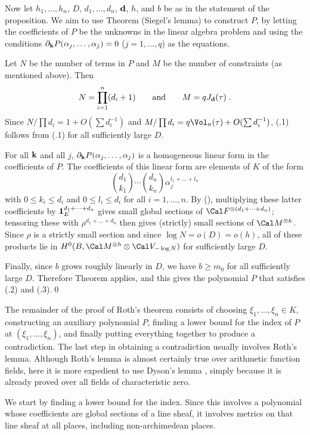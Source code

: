 Now let $h_1,\dots,h_n$, $D$, $d_1,\dots,d_n$, $\bold d$, $h$, and $b$ be as
in the statement of the proposition.  We aim to use Theorem 
(Siegel's lemma) to construct $P$, by letting the coefficients of $P$ be the
unknowns in the linear algebra problem and using the conditions
$\partial_{\bold k}P(\alpha_j,\dots,\alpha_j)=0$ ($j=1,\dots,q$)
as the equations.

Let $N$ be the number of terms in $P$ and $M$ be the number of constraints
(as mentioned above).  Then
$$N = \prod_{i=1}^n (d_i+1) \qquad\text{and}\qquad M = qJ_{\bold d}(\tau)\;.$$
Since $N/\prod d_i=1+O(\sum d_i^{-1})$
and $M/\prod d_i=q\Vol_n(\tau)+O(\sum d_i^{-1})$, (.1)
follows from (.1) for all sufficiently large $D$.

For all $\bold k$ and all $j$, $\partial_{\bold k}P(\alpha_j,\dots,\alpha_j)$
is a homogeneous linear form in the coefficients of $P$.
The coefficients of this linear form are elements of $K$ of the form
$$\binom{d_1}{k_1}\dotsm\binom{d_n}{k_n}\alpha_j^{l_1+\dots+l_n}$$
with $0\le k_i\le d_i$ and $0\le l_i\le d_i$ for all $i=1,\dots,n$.
By (), multiplying these latter coefficients by $\bold 1_E^{d_1+\dots+d_n}$
gives small global sections of $\Cal F^{\otimes(d_1+\dots+d_n)}$;
tensoring these with $\rho^{d_1+\dots+d_n}$ then gives
(strictly) small sections of $\Cal M^{\otimes h}$.
Since $\rho$ is a strictly small section and since $\log N=o(D)=o(h)$,
all of these products lie in $H^0(B,\Cal M^{\otimes h}\otimes\Cal V_{-\log N})$
for sufficiently large $D$.

Finally, since $b$ grows roughly linearly in $D$, we have $b\ge m_0$
for all sufficiently large $D$.  Therefore Theorem  applies, and
this gives the polynomial $P$ that satisfies (.2) and (.3).\qed
\enddemo


The remainder of the proof of Roth's theorem consists of choosing
$\xi_1,\dots,\xi_n\in K$, constructing an auxiliary polynomial $P$,
finding a lower bound for the index of $P$ at $(\xi_1,\dots,\xi_n)$, and
finally putting everything together to produce a contradiction.
The last step in obtaining a contradiction usually involves Roth's lemma.
Although Roth's lemma is almost certainly true over arithmetic function fields,
here it is more expedient to use Dyson's lemma \citep{ev84},
simply because it is already proved over all fields of characteristic zero.

We start by finding a lower bound for the index.  Since this involves a
polynomial whose coefficients are global sections of a line sheaf, it
involves metrics on that line sheaf at all places, including non-archimedean
places.

